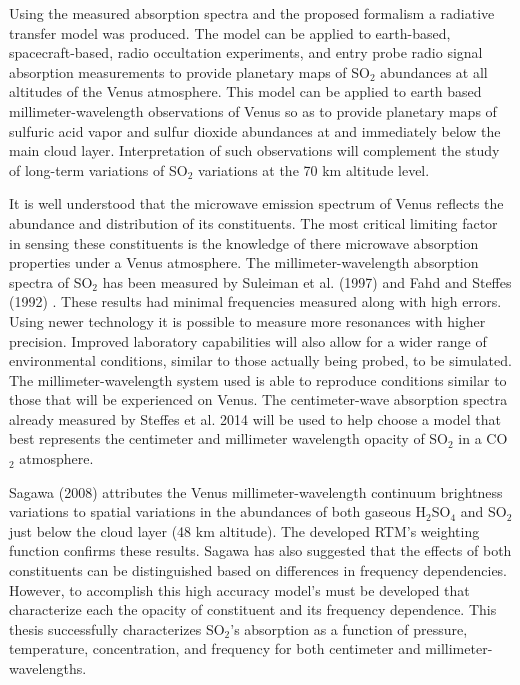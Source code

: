 Using the measured absorption spectra and the proposed formalism a radiative transfer model was produced. The model can be applied to earth-based, spacecraft-based, radio occultation experiments, and entry probe radio signal absorption measurements to provide planetary maps of SO$_2$ abundances at all altitudes of the Venus atmosphere. %
This model can be applied to earth based millimeter-wavelength observations of Venus so as to provide planetary maps of sulfuric acid vapor and sulfur dioxide abundances at and immediately below the main cloud layer. Interpretation of such observations will complement the study of long-term variations of SO$_2$ variations at the 70 km altitude level. 

It is well understood that the microwave emission spectrum of Venus reflects the abundance and distribution of its constituents. The most critical limiting factor in sensing these constituents is the knowledge of there microwave absorption properties under a Venus atmosphere. The millimeter-wavelength absorption spectra of SO$_2$ has been measured by Suleiman et al. (1997) \cite{Suleiman-thesis} and Fahd and Steffes (1992) \cite{Fahd-thesis}. These results had minimal frequencies measured along with high errors. Using newer technology it is possible to measure more resonances with higher precision. Improved laboratory capabilities will also allow for a wider range of environmental conditions, similar to those actually being probed, to be simulated. The millimeter-wavelength system used is able to reproduce conditions similar to those that will be experienced on Venus. The centimeter-wave absorption spectra already measured by Steffes et al. 2014 \cite{Steffes-2014} will be used to help choose a model that best represents the centimeter and millimeter wavelength opacity of SO$_2$ in a CO$_2$ atmosphere. 

Sagawa (2008) attributes the Venus millimeter-wavelength continuum brightness variations to spatial variations in the abundances of both gaseous H$_2$SO$_4$ and SO$_2$ just below the cloud layer (48 km altitude). The developed RTM's weighting function confirms these results. Sagawa has also suggested that the effects of both constituents can be distinguished based on differences in frequency dependencies. However, to accomplish this high accuracy model's must be developed that characterize each the opacity of constituent and its frequency dependence. This thesis successfully characterizes SO$_2$'s absorption as a function of pressure, temperature, concentration, and frequency for both centimeter and millimeter-wavelengths. 


